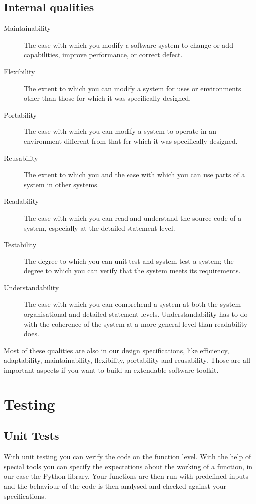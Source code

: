 \documentclass[a4paper, openany, oneside]{memoir}
\begin{document}
\subsection{Internal qualities}
\begin{description}
\item[Maintainability] The ease with which you modify a software system to change or add capabilities, improve performance, or correct defect.
\item[Flexibility] The extent to which you can modify a system for uses or environments other than those for which it was specifically designed.
\item[Portability] The ease with which you can modify a system to operate in an environment different from that for which it was specifically designed.
\item[Reusability] The extent to which you and the ease with which you can use parts of a system in other systems.
\item[Readability] The ease with which you can read and understand the source code of a system, especially at the detailed-statement level.
\item[Testability] The degree to which you can unit-test and system-test a system; the degree to which you can verify that the system meets its requirements.
\item[Understandability] The ease with which you can comprehend a system at both the system-organisational and detailed-statement levels. Understandability has to do with the coherence of the system at a more general level than readability does.
\end{description}

Most of these qualities are also in our design specifications, like efficiency, adaptability, maintainability, flexibility, portability and reusability. Those are all important aspects if you want to build an extendable software toolkit.

\section{Testing}
\subsection{Unit Tests}
With unit testing you can verify the code on the function level. With the help of special tools you can specify the expectations about the working of a function, in our case the Python  library. Your functions are then run with predefined inputs and the behaviour of the code is then analysed and checked against your specifications.
\end{document}
